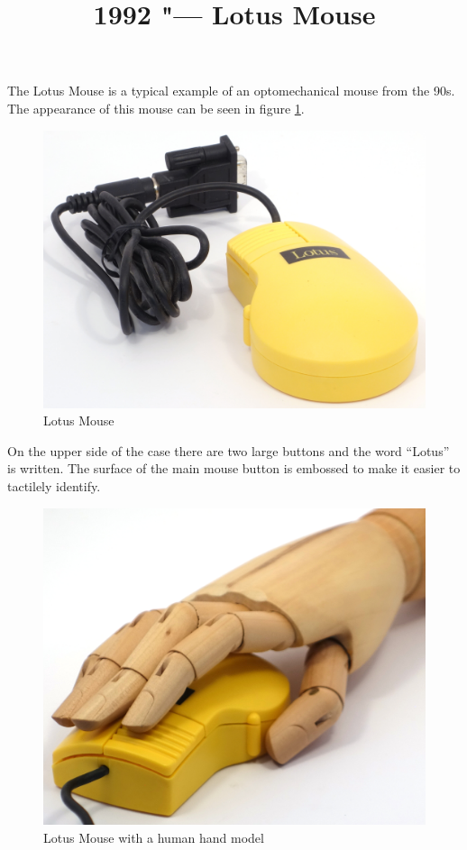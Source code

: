 \documentclass[11pt, a4paper]{article}
\begin{document}
\title{1992 "--- Lotus Mouse}
\date{}
\maketitle
{}
The Lotus Mouse is a typical example of an optomechanical mouse from the 90s. The appearance of this mouse can be seen in figure \ref{fig:LotusPic}.

\begin{figure}[h]
    \centering
    \includegraphics[scale=0.6]{1992_lotus_mouse/pic_30.jpg}
    \caption{Lotus Mouse}
    \label{fig:LotusPic}
\end{figure}

On the upper side of the case there are two large buttons and the word “Lotus” is written. The surface of the main mouse button is embossed to make it easier to tactilely identify.

\begin{figure}[h]
    \centering
    \includegraphics[scale=0.3]{1992_lotus_mouse/hand_30.jpg}
    \caption{Lotus Mouse with a human hand model}
    \label{fig:LotusHand}
\end{figure}
\end{document}
